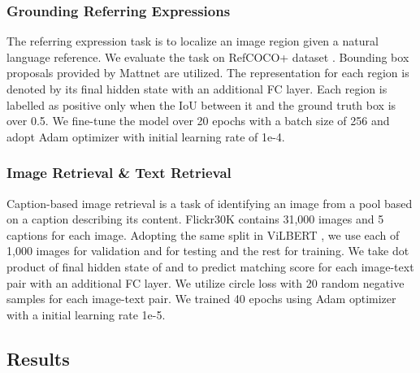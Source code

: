 \documentclass[letterpaper]{article} \usepackage{aaai21}  \usepackage{times}  \usepackage{helvet} \usepackage{courier}  \usepackage[hyphens]{url}  \usepackage{graphicx} \urlstyle{rm} \def\UrlFont{\rm}  \usepackage{natbib}  \usepackage{caption} \frenchspacing  \setlength{\pdfpagewidth}{8.5in}  \setlength{\pdfpageheight}{11in}  \usepackage{cite}
\begin{document}
\subsubsection{Grounding Referring Expressions}

The referring expression task is to localize an image region given a natural language reference. We evaluate the task on RefCOCO+ dataset \cite{kazemzadeh2014referitgame}. Bounding box proposals provided by Mattnet \cite{yu2018mattnet}  are utilized. The representation for each region is denoted by its final hidden state  with an additional FC layer. Each region  is labelled as positive only when the IoU between it and the ground truth box is over 0.5.  We fine-tune the model over 20 epochs with a batch size of 256 and  adopt Adam optimizer with initial learning rate of 1e-4. 

\subsubsection{Image Retrieval \& Text Retrieval}

Caption-based image retrieval is a task of identifying an image from a pool based on a caption describing its content. Flickr30K \cite{young2014image} contains 31,000 images and 5 captions for each image. Adopting the same split in ViLBERT \cite{lu2019vilbert}, we use each of 1,000 images for validation and for testing and the rest for training. We take dot product of final hidden state of   and  to predict matching score  for each image-text pair with an additional FC layer. We utilize circle loss \cite{sun2020circle} with 20 random negative samples for each image-text pair.
We trained 40 epochs using Adam optimizer with a initial learning rate 1e-5. 




\subsection{Results}
\end{document}
